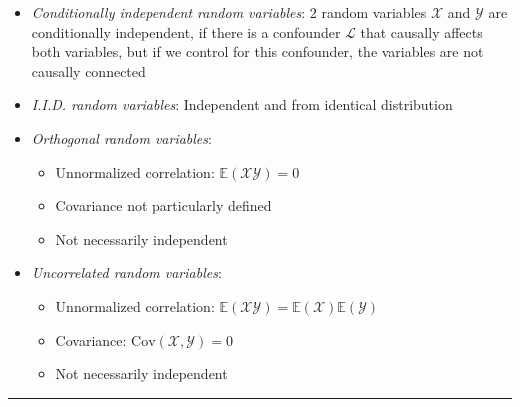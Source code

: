 \begin{itemize}
\begin{itemize}
\begin{itemize}
        \end{itemize}
    \end{itemize}
    \item \emph{Conditionally independent random variables}: $2$ random variables $\mathcal{X}$ and $\mathcal{Y}$ are conditionally independent, if there is a confounder $\mathcal{L}$ that causally affects both variables, but if we control for this confounder, the variables are not causally connected
    \item \emph{I.I.D. random variables}: Independent and from identical distribution
    \item \emph{Orthogonal random variables}: 
    \begin{itemize}
        \item Unnormalized correlation: $\mathbb{E}(\mathcal{X}\mathcal{Y})=0$
        \item Covariance not particularly defined
        \item Not necessarily independent
    \end{itemize}
    \item \emph{Uncorrelated random variables}: 
    \begin{itemize}
        \item Unnormalized correlation: $\mathbb{E}(\mathcal{X}\mathcal{Y})=\mathbb{E}(\mathcal{X})\mathbb{E}(\mathcal{Y})$
        \item Covariance: $\textrm{Cov}(\mathcal{X},\mathcal{Y}) = 0$
        \item Not necessarily independent
    \end{itemize} 
\end{itemize}

{\color{lightgray}\hrule height 0.001mm}

